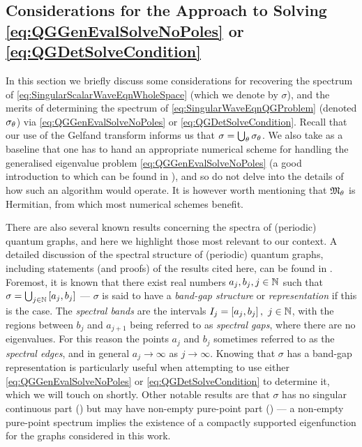 \subsection{Considerations for the Approach to Solving \eqref{eq:QGGenEvalSolveNoPoles} or \eqref{eq:QGDetSolveCondition}} \label{ssec:ApproachConsiderations}
In this section we briefly discuss some considerations for recovering the spectrum of \eqref{eq:SingularScalarWaveEqnWholeSpace} (which we denote by $\sigma$), and the merits of determining the spectrum of \eqref{eq:SingularWaveEqnQGProblem} (denoted $\sigma_\theta$) via \eqref{eq:QGGenEvalSolveNoPoles} or \eqref{eq:QGDetSolveCondition}.
Recall that our use of the Gelfand transform informs us that $\sigma = \bigcup_{\theta}\sigma_{\theta}$.
We also take as a baseline that one has to hand an appropriate numerical scheme for handling the generalised eigenvalue problem \eqref{eq:QGGenEvalSolveNoPoles} (a good introduction to which can be found in \cite{guttel2017nonlinear}), and so do not delve into the details of how such an algorithm would operate.
It is however worth mentioning that $\mathfrak{M}_\theta$ is Hermitian, from which most numerical schemes benefit.

There are also several known results concerning the spectra of (periodic) quantum graphs, and here we highlight those most relevant to our context. 
A detailed discussion of the spectral structure of (periodic) quantum graphs, including statements (and proofs) of the results cited here, can be found in \cite[Chapter 4]{berkolaiko2013introduction}.
Foremost, it is known that there exist real numbers $a_j, b_j, j\in\mathbb{N}$ such that $\sigma = \bigcup_{j\in\mathbb{N}}\left[ a_j,b_j \right]$ --- $\sigma$ is said to have a \emph{band-gap structure} or \emph{representation} \cite[Chapter 4.3]{berkolaiko2013introduction} if this is the case.
The \emph{spectral bands} are the intervals $I_j=\left[ a_j,b_j \right], \ j\in\mathbb{N}$, with the regions between $b_j$ and $a_{j+1}$ being referred to as \emph{spectral gaps}, where there are no eigenvalues.
For this reason the points $a_j$ and $b_j$ sometimes referred to as the \emph{spectral edges}, and in general $a_j\rightarrow\infty$ as $j\rightarrow\infty$.
Knowing that $\sigma$ has a band-gap representation is particularly useful when attempting to use either \eqref{eq:QGGenEvalSolveNoPoles} or \eqref{eq:QGDetSolveCondition} to determine it, which we will touch on shortly.
Other notable results are that $\sigma$ has no singular continuous part (\cite[Chapter 4.4]{berkolaiko2013introduction}) but may have non-empty pure-point part (\cite[Chapter 4.5]{berkolaiko2013introduction}) --- a non-empty pure-point spectrum implies the existence of a compactly supported eigenfunction for the graphs considered in this work.

